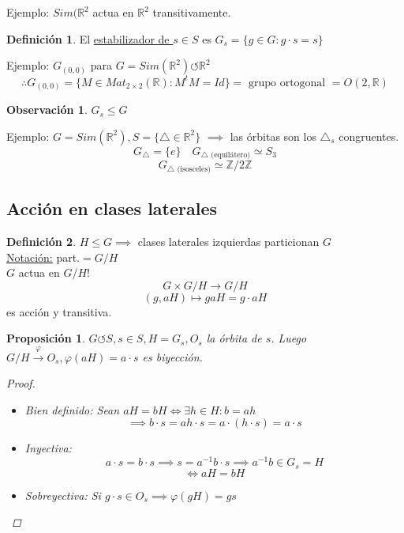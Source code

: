 \documentclass[11pt]{book}
\newtheorem{prop}[thm]{Proposición}
\theoremstyle{definition}
\newtheorem{defn}{Definición}[section]
\newtheorem{obs}{Observación}[section]
\begin{document}
Ejemplo: $Sim(\mathbb{R}^2$ actua en $\mathbb{R}^2$ transitivamente.
\begin{defn}
	El \underline{estabilizador de $s\in S$} es $G_s=\{g\in G: g\cdot s=s\}$
\end{defn}
Ejemplo: $G_{(0,0)}$ para $G=Sim(\mathbb{R}^2)\circlearrowleft\mathbb{R}^2$
\[\therefore G_{(0,0)}=\{M\in Mat_{2\times 2}(\mathbb{R}):M^tM=Id\}=\textrm{ grupo ortogonal }= O(2,\mathbb{R})\]
\begin{obs}
	$G_s\leq G$
\end{obs}
Ejemplo: $G=Sim(\mathbb{R}^2), S=\{\triangle\in\mathbb{R}^2\}$
$\implies$ las órbitas son los $\triangle_s$ congruentes.
\[G_\triangle=\{e\}\quad G_{\triangle\textrm{ (equilátero)}}\simeq S_3\]
\[G_{\triangle\textrm{ (isosceles)}}\simeq \mathbb{Z}/2\mathbb{Z}\]
\subsection{Acción en clases laterales}
\begin{defn}
	$H\leq G\implies$ clases laterales izquierdas particionan $G$\\
	\underline{Notación:} part.$=G/H$\\
	$G$ actua en $G/H$!
	\[G\times G/H\rightarrow G/H\]
	\[(g, aH)\mapsto gaH=g\cdot aH\]
	es acción y transitiva.
\end{defn}
\begin{prop}
	$G\circlearrowleft S, s\in S, H=G_s, O_s$ la órbita de $s$. Luego $G/H\xrightarrow{\varphi}O_s,\varphi(aH)=a\cdot s$ es biyección.
	\begin{proof}
		\begin{itemize}
			\item Bien definido: Sean $aH=bH\iff \exists h\in H: b=ah$
			\[\implies b\cdot s= ah\cdot s= a\cdot(h\cdot s)= a\cdot s\]
			
			\item Inyectiva:
			\[a\cdot s=b\cdot s\implies s=a^{-1}b\cdot s\implies a^{-1}b\in G_s=H\]
			\[\iff aH=bH\]

			\item  Sobreyectiva: Si $g\cdot s\in O_s\implies\varphi(gH)=gs$
		\end{itemize}
	\end{proof}
\end{prop}
\end{document}
